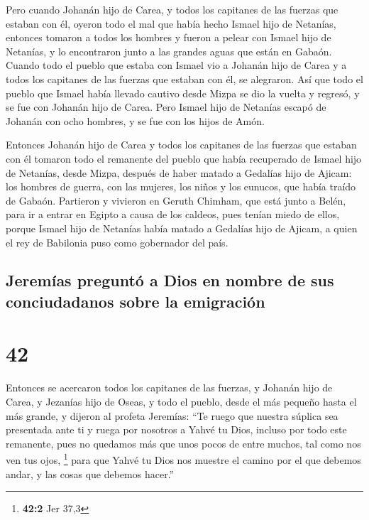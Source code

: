  Pero cuando Johanán hijo de Carea, y todos los capitanes
de las fuerzas que estaban con él, oyeron todo el mal que había hecho
Ismael hijo de Netanías,  entonces tomaron a todos los
hombres y fueron a pelear con Ismael hijo de Netanías, y lo encontraron
junto a las grandes aguas que están en Gabaón.  Cuando
todo el pueblo que estaba con Ismael vio a Johanán hijo de Carea y a
todos los capitanes de las fuerzas que estaban con él, se alegraron.
 Así que todo el pueblo que Ismael había llevado cautivo
desde Mizpa se dio la vuelta y regresó, y se fue con Johanán hijo de
Carea.  Pero Ismael hijo de Netanías escapó de Johanán
con ocho hombres, y se fue con los hijos de Amón.

 Entonces Johanán hijo de Carea y todos los capitanes de
las fuerzas que estaban con él tomaron todo el remanente del pueblo que
había recuperado de Ismael hijo de Netanías, desde Mizpa, después de
haber matado a Gedalías hijo de Ajicam: los hombres de guerra, con las
mujeres, los niños y los eunucos, que había traído de Gabaón.
 Partieron y vivieron en Geruth Chimham, que está junto a
Belén, para ir a entrar en Egipto  a causa de los
caldeos, pues tenían miedo de ellos, porque Ismael hijo de Netanías
había matado a Gedalías hijo de Ajicam, a quien el rey de Babilonia puso
como gobernador del país.

\hypertarget{jeremuxedas-preguntuxf3-a-dios-en-nombre-de-sus-conciudadanos-sobre-la-emigraciuxf3n}{%
\subsection{Jeremías preguntó a Dios en nombre de sus conciudadanos
sobre la
emigración}\label{jeremuxedas-preguntuxf3-a-dios-en-nombre-de-sus-conciudadanos-sobre-la-emigraciuxf3n}}

\hypertarget{section-41}{%
\section{42}\label{section-41}}

 Entonces se acercaron todos los capitanes de las fuerzas,
y Johanán hijo de Carea, y Jezanías hijo de Oseas, y todo el pueblo,
desde el más pequeño hasta el más grande,  y dijeron al
profeta Jeremías: ``Te ruego que nuestra súplica sea presentada ante ti
y ruega por nosotros a Yahvé tu Dios, incluso por todo este remanente,
pues no quedamos más que unos pocos de entre muchos, tal como nos ven
tus ojos, \footnote{\textbf{42:2} Jer 37,3}  para que
Yahvé tu Dios nos muestre el camino por el que debemos andar, y las
cosas que debemos hacer.''

